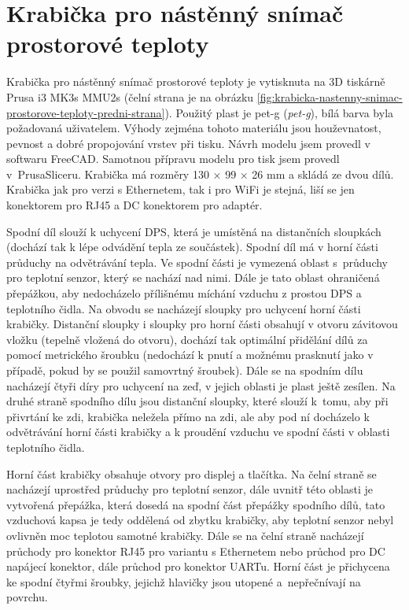 \section{Krabička pro nástěnný snímač prostorové teploty}
\label{sec:krabicka-pro-nastenny-snimac-prostorove-teploty}
Krabička pro nástěnný snímač prostorové teploty je vytisknuta na 3D tiskárně Prusa i3 MK3s MMU2s (čelní strana je na obrázku \ref{fig:krabicka-nastenny-snimac-prostorove-teploty-predni-strana}). Použitý plast je \acrshort{pet-g} (\textit{\acrlong{pet-g}}), bílá barva byla požadovaná uživatelem. Výhody zejména tohoto materiálu jsou houževnatost, pevnost a dobré propojování vrstev při tisku. Návrh modelu jsem provedl v softwaru FreeCAD. Samotnou přípravu modelu pro tisk jsem provedl v~PrusaSliceru. Krabička má rozměry 130 × 99 × 26 mm a skládá ze dvou dílů. Krabička jak pro verzi s Ethernetem, tak i pro WiFi je stejná, liší se jen konektorem pro RJ45 a DC konektorem pro adaptér.

Spodní díl slouží k uchycení DPS, která je umístěná na distančních sloupkách (dochází tak k lépe odvádění tepla ze součástek). Spodní díl má v horní části průduchy na odvětrávání tepla. Ve spodní části je vymezená oblast s~průduchy pro teplotní senzor, který se nachází nad nimi. Dále je tato oblast ohraničená přepážkou, aby nedocházelo přílišnému míchání vzduchu z prostou DPS a teplotního čidla. Na obvodu se nacházejí sloupky pro uchycení horní části krabičky. Distanční sloupky i sloupky pro horní části obsahují v otvoru závitovou vložku (tepelně vložená do otvoru), dochází tak optimální přidělání dílů za pomocí metrického šroubku (nedochází k pnutí a možnému prasknutí jako v případě, pokud by se použil samovrtný šroubek). Dále se na spodním dílu nacházejí čtyři díry pro uchycení na zeď, v jejich oblasti je plast ještě zesílen. Na druhé straně spodního dílu jsou distanční sloupky, které slouží k~tomu, aby při přivrtání ke zdi, krabička neležela přímo na zdi, ale aby pod ní docházelo k odvětrávání horní části krabičky a k proudění vzduchu ve spodní části v oblasti teplotního čidla.

Horní část krabičky obsahuje otvory pro displej a tlačítka. Na čelní straně se nacházejí uprostřed průduchy pro teplotní senzor, dále uvnitř této oblasti je vytvořená přepážka, která dosedá na spodní část přepážky spodního dílů, tato vzduchová kapsa je tedy oddělená od zbytku krabičky, aby teplotní senzor nebyl ovlivněn moc teplotou samotné krabičky. Dále se na čelní straně nacházejí průchody pro konektor RJ45 pro variantu s Ethernetem nebo průchod pro DC napájecí konektor, dále průchod pro konektor UARTu. Horní část je přichycena ke spodní čtyřmi šroubky, jejichž hlavičky jsou utopené a~nepřečnívají na povrchu.

